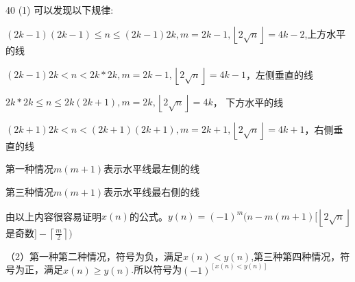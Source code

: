 \documentclass[onecolumn]{article}
\begin{document}
~\\
40 (1) 可以发现以下规律: \par
$(2k-1)(2k-1)\leq n \leq (2k-1)2k,m=2k-1,\left \lfloor 2\sqrt{n} \right \rfloor =4k-2$,上方水平的线 \par
$(2k-1)2k< n < 2k*2k, m=2k-1, \left \lfloor 2\sqrt{n} \right \rfloor =4k-1$，左侧垂直的线 \par
$2k*2k\leq n \leq 2k(2k+1), m=2k, \left \lfloor 2\sqrt{n} \right \rfloor =4k$， 下方水平的线 \par
$ (2k+1)2k< n < (2k+1)(2k+1), m=2k+1, \left \lfloor 2\sqrt{n} \right \rfloor =4k+1$，右侧垂直的线 \par
第一种情况$m(m+1)$表示水平线最左侧的线 \par
第三种情况$m(m+1)$表示水平线最右侧的线 \par
由以上内容很容易证明$x(n)$的公式。$y(n)=(-1)^{m}(n-m(m+1)[\left \lfloor 2\sqrt{n} \right \rfloor$是奇数$]-\left \lceil \frac{m}{2} \right \rceil)$ \par
（2）第一种第二种情况，符号为负，满足$x(n) < y(n)$,第三种第四种情况，符号为正，满足$x(n) \geq y(n)$.所以符号为$(-1)^{[x(n)<y(n)]}$ \par
~\\
\end{document}
